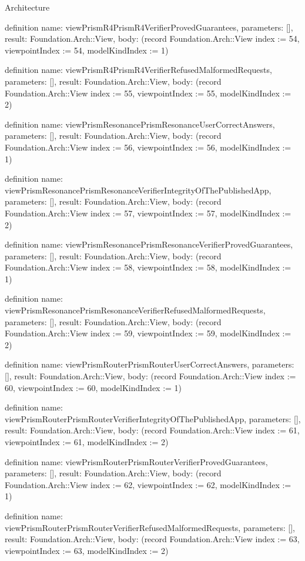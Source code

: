 \begin{lexlean}{Architecture}
\begin{semanticmodule}
definition{
  name: viewPrismR4PrismR4VerifierProvedGuarantees,
  parameters: [],
  result: Foundation.Arch::View,
  body: (record Foundation.Arch::View {index := 54, viewpointIndex := 54, modelKindIndex := 1})
}

definition{
  name: viewPrismR4PrismR4VerifierRefusedMalformedRequests,
  parameters: [],
  result: Foundation.Arch::View,
  body: (record Foundation.Arch::View {index := 55, viewpointIndex := 55, modelKindIndex := 2})
}

definition{
  name: viewPrismResonancePrismResonanceUserCorrectAnswers,
  parameters: [],
  result: Foundation.Arch::View,
  body: (record Foundation.Arch::View {index := 56, viewpointIndex := 56, modelKindIndex := 1})
}

definition{
  name: viewPrismResonancePrismResonanceVerifierIntegrityOfThePublishedApp,
  parameters: [],
  result: Foundation.Arch::View,
  body: (record Foundation.Arch::View {index := 57, viewpointIndex := 57, modelKindIndex := 2})
}

definition{
  name: viewPrismResonancePrismResonanceVerifierProvedGuarantees,
  parameters: [],
  result: Foundation.Arch::View,
  body: (record Foundation.Arch::View {index := 58, viewpointIndex := 58, modelKindIndex := 1})
}

definition{
  name: viewPrismResonancePrismResonanceVerifierRefusedMalformedRequests,
  parameters: [],
  result: Foundation.Arch::View,
  body: (record Foundation.Arch::View {index := 59, viewpointIndex := 59, modelKindIndex := 2})
}

definition{
  name: viewPrismRouterPrismRouterUserCorrectAnswers,
  parameters: [],
  result: Foundation.Arch::View,
  body: (record Foundation.Arch::View {index := 60, viewpointIndex := 60, modelKindIndex := 1})
}

definition{
  name: viewPrismRouterPrismRouterVerifierIntegrityOfThePublishedApp,
  parameters: [],
  result: Foundation.Arch::View,
  body: (record Foundation.Arch::View {index := 61, viewpointIndex := 61, modelKindIndex := 2})
}

definition{
  name: viewPrismRouterPrismRouterVerifierProvedGuarantees,
  parameters: [],
  result: Foundation.Arch::View,
  body: (record Foundation.Arch::View {index := 62, viewpointIndex := 62, modelKindIndex := 1})
}

definition{
  name: viewPrismRouterPrismRouterVerifierRefusedMalformedRequests,
  parameters: [],
  result: Foundation.Arch::View,
  body: (record Foundation.Arch::View {index := 63, viewpointIndex := 63, modelKindIndex := 2})
}


\end{semanticmodule}
\end{lexlean}
